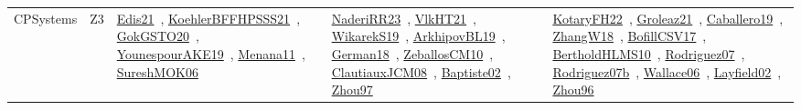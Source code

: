 {\begin{longtable}{lp{3cm}>{\raggedright\arraybackslash}p{6cm}>{\raggedright\arraybackslash}p{6cm}>{\raggedright\arraybackslash}p{8cm}}
CPSystems & Z3 & \href{../works/Edis21.pdf}{Edis21}~\cite{Edis21}, \href{../works/KoehlerBFFHPSSS21.pdf}{KoehlerBFFHPSSS21}~\cite{KoehlerBFFHPSSS21}, \href{../works/GokGSTO20.pdf}{GokGSTO20}~\cite{GokGSTO20}, \href{../works/YounespourAKE19.pdf}{YounespourAKE19}~\cite{YounespourAKE19}, \href{../works/Menana11.pdf}{Menana11}~\cite{Menana11}, \href{../works/SureshMOK06.pdf}{SureshMOK06}~\cite{SureshMOK06} & \href{../works/NaderiRR23.pdf}{NaderiRR23}~\cite{NaderiRR23}, \href{../works/VlkHT21.pdf}{VlkHT21}~\cite{VlkHT21}, \href{../works/WikarekS19.pdf}{WikarekS19}~\cite{WikarekS19}, \href{../works/ArkhipovBL19.pdf}{ArkhipovBL19}~\cite{ArkhipovBL19}, \href{../works/German18.pdf}{German18}~\cite{German18}, \href{../works/ZeballosCM10.pdf}{ZeballosCM10}~\cite{ZeballosCM10}, \href{../works/ClautiauxJCM08.pdf}{ClautiauxJCM08}~\cite{ClautiauxJCM08}, \href{../works/Baptiste02.pdf}{Baptiste02}~\cite{Baptiste02}, \href{../works/Zhou97.pdf}{Zhou97}~\cite{Zhou97} & \href{../works/KotaryFH22.pdf}{KotaryFH22}~\cite{KotaryFH22}, \href{../works/Groleaz21.pdf}{Groleaz21}~\cite{Groleaz21}, \href{../works/Caballero19.pdf}{Caballero19}~\cite{Caballero19}, \href{../works/ZhangW18.pdf}{ZhangW18}~\cite{ZhangW18}, \href{../works/BofillCSV17.pdf}{BofillCSV17}~\cite{BofillCSV17}, \href{../works/BertholdHLMS10.pdf}{BertholdHLMS10}~\cite{BertholdHLMS10}, \href{../works/Rodriguez07.pdf}{Rodriguez07}~\cite{Rodriguez07}, \href{../works/Rodriguez07b.pdf}{Rodriguez07b}~\cite{Rodriguez07b}, \href{../works/Wallace06.pdf}{Wallace06}~\cite{Wallace06}, \href{../works/Layfield02.pdf}{Layfield02}~\cite{Layfield02}, \href{../works/Zhou96.pdf}{Zhou96}~\cite{Zhou96}\\
\end{longtable}
}

